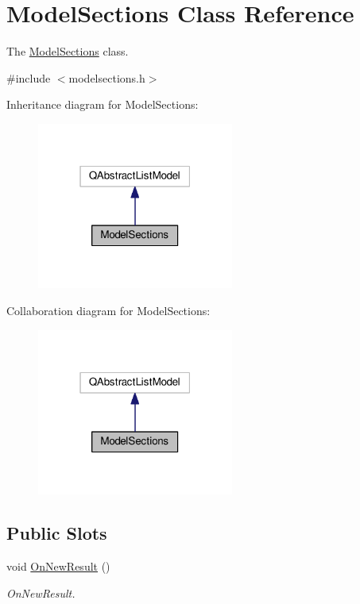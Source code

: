 \hypertarget{class_model_sections}{}\section{Model\+Sections Class Reference}
\label{class_model_sections}


The \hyperlink{class_model_sections}{Model\+Sections} class.  




{\ttfamily \#include $<$modelsections.\+h$>$}



Inheritance diagram for Model\+Sections\+:
\nopagebreak
\begin{figure}[H]
\begin{center}
\leavevmode
\includegraphics[width=183pt]{class_model_sections__inherit__graph}
\end{center}
\end{figure}


Collaboration diagram for Model\+Sections\+:
\nopagebreak
\begin{figure}[H]
\begin{center}
\leavevmode
\includegraphics[width=183pt]{class_model_sections__coll__graph}
\end{center}
\end{figure}
\subsection*{Public Slots}
\begin{DoxyCompactItemize}
\item 
void \hyperlink{class_model_sections_ae6b216f4975cda057d69628ef9ee5e63}{On\+New\+Result} ()\hypertarget{class_model_sections_ae6b216f4975cda057d69628ef9ee5e63}{}\label{class_model_sections_ae6b216f4975cda057d69628ef9ee5e63}

\begin{DoxyCompactList}\small\item\em On\+New\+Result. \end{DoxyCompactList}\end{DoxyCompactItemize}
